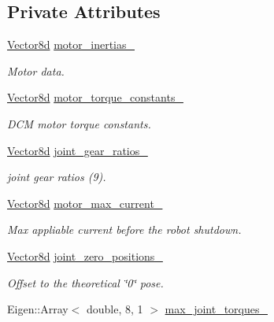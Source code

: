 \subsection*{Private Attributes}
\begin{DoxyCompactItemize}
\item 
\hyperlink{common__header_8hpp_a98975ffbe0bca1296078e0350dfedd60}{Vector8d} \hyperlink{classblmc__robots_1_1Solo8_ad2a475dd31443243c1683c2fb091418e}{motor\+\_\+inertias\+\_\+}
\begin{DoxyCompactList}\small\item\em Motor data. \end{DoxyCompactList}\item 
\hyperlink{common__header_8hpp_a98975ffbe0bca1296078e0350dfedd60}{Vector8d} \hyperlink{classblmc__robots_1_1Solo8_a21293b97b37bcd42b3e3766a72fabf26}{motor\+\_\+torque\+\_\+constants\+\_\+}
\begin{DoxyCompactList}\small\item\em D\+CM motor torque constants. \end{DoxyCompactList}\item 
\hyperlink{common__header_8hpp_a98975ffbe0bca1296078e0350dfedd60}{Vector8d} \hyperlink{classblmc__robots_1_1Solo8_a09ab41c9822e1f1c853d0b9065205d2d}{joint\+\_\+gear\+\_\+ratios\+\_\+}
\begin{DoxyCompactList}\small\item\em joint gear ratios (9). \end{DoxyCompactList}\item 
\hyperlink{common__header_8hpp_a98975ffbe0bca1296078e0350dfedd60}{Vector8d} \hyperlink{classblmc__robots_1_1Solo8_af9b0800cd9ef22713767298ef850eddf}{motor\+\_\+max\+\_\+current\+\_\+}
\begin{DoxyCompactList}\small\item\em Max appliable current before the robot shutdown. \end{DoxyCompactList}\item 
\hyperlink{common__header_8hpp_a98975ffbe0bca1296078e0350dfedd60}{Vector8d} \hyperlink{classblmc__robots_1_1Solo8_a31f29f1bf604552b2ae5d017e5f3e2d1}{joint\+\_\+zero\+\_\+positions\+\_\+}
\begin{DoxyCompactList}\small\item\em Offset to the theoretical \char`\"{}0\char`\"{} pose. \end{DoxyCompactList}\item 
Eigen\+::\+Array$<$ double, 8, 1 $>$ \hyperlink{classblmc__robots_1_1Solo8_a053f46bebf56986d976e34c0c47956c9}{max\+\_\+joint\+\_\+torques\+\_\+}\hypertarget{classblmc__robots_1_1Solo8_a053f46bebf56986d976e34c0c47956c9}{}\label{classblmc__robots_1_1Solo8_a053f46bebf56986d976e34c0c47956c9}


\end{DoxyCompactItemize}

